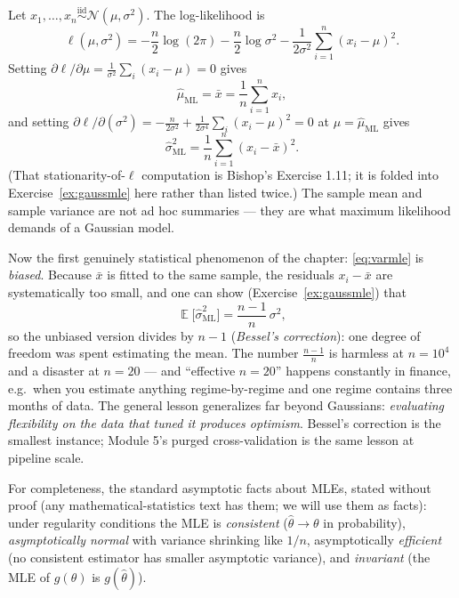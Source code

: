 \documentclass[11pt]{article}
\numberwithin{equation}{section}
\theoremstyle{plain}
\theoremstyle{definition}
\theoremstyle{remark}
\DeclareMathOperator{\E}{\mathbb{E}}
\newcommand{\Normal}{\mathcal{N}}
\begin{document}
Let $x_1, \dots, x_n \overset{\text{iid}}{\sim} \Normal(\mu, \sigma^2)$. The log-likelihood is
\begin{equation}
\ell(\mu, \sigma^2)
= -\frac{n}{2}\log(2\pi) - \frac{n}{2}\log \sigma^2 - \frac{1}{2\sigma^2}\sum_{i=1}^n (x_i - \mu)^2 .
\label{eq:gaussll}
\end{equation}
Setting $\partial \ell / \partial \mu = \frac{1}{\sigma^2}\sum_i (x_i - \mu) = 0$ gives
\begin{equation}
\hat\mu_{\mathrm{ML}} = \bar{x} = \frac1n \sum_{i=1}^n x_i,
\end{equation}
and setting $\partial \ell / \partial(\sigma^2) = -\frac{n}{2\sigma^2} + \frac{1}{2\sigma^4}\sum_i (x_i - \mu)^2 = 0$ at $\mu = \hat\mu_{\mathrm{ML}}$ gives
\begin{equation}
\hat\sigma^2_{\mathrm{ML}} = \frac1n \sum_{i=1}^n (x_i - \bar{x})^2 .
\label{eq:varmle}
\end{equation}
(That stationarity-of-$\ell$ computation is Bishop's Exercise 1.11; it is folded into Exercise~\ref{ex:gaussmle} here rather than listed twice.) The sample mean and sample variance are not ad hoc summaries --- they are what maximum likelihood demands of a Gaussian model.

Now the first genuinely statistical phenomenon of the chapter: \eqref{eq:varmle} is \emph{biased}. Because $\bar{x}$ is fitted to the same sample, the residuals $x_i - \bar{x}$ are systematically too small, and one can show (Exercise~\ref{ex:gaussmle}) that
\begin{equation}
\E\big[\hat\sigma^2_{\mathrm{ML}}\big] = \frac{n-1}{n}\,\sigma^2 ,
\end{equation}
so the unbiased version divides by $n - 1$ (\emph{Bessel's correction}): one degree of freedom was spent estimating the mean. The number $\tfrac{n-1}{n}$ is harmless at $n = 10^4$ and a disaster at $n = 20$ --- and ``effective $n = 20$'' happens constantly in finance, e.g.\ when you estimate anything regime-by-regime and one regime contains three months of data. The general lesson generalizes far beyond Gaussians: \emph{evaluating flexibility on the data that tuned it produces optimism}. Bessel's correction is the smallest instance; Module 5's purged cross-validation is the same lesson at pipeline scale.

For completeness, the standard asymptotic facts about MLEs, stated without proof (any mathematical-statistics text has them; we will use them as facts): under regularity conditions the MLE is \emph{consistent} ($\hat\theta \to \theta$ in probability), \emph{asymptotically normal} with variance shrinking like $1/n$, asymptotically \emph{efficient} (no consistent estimator has smaller asymptotic variance), and \emph{invariant} (the MLE of $g(\theta)$ is $g(\hat\theta)$).
\end{document}

